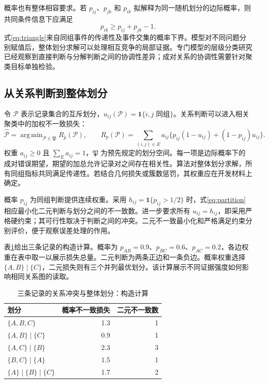 \documentclass[UTF8,a4paper,zihao=-4,fontset=fandol]{ctexart}
\newcommand{\ind}{\mathbf 1}
\DeclareMathOperator*{\argmin}{arg\,min}
\begin{document}
概率也有整体相容要求。若 $p_{ij}$、$p_{jk}$ 和 $p_{ik}$ 拟解释为同一随机划分的边际概率，则共同条件信息下应满足
\begin{equation}
 p_{ik}\geq p_{ij}+p_{jk}-1.
 \label{eq:triangle}
\end{equation}
式\eqref{eq:triangle}来自同组事件的传递性及事件交集的概率下界。模型对不同问题分别赋值后，整体划分求解可以处理相互竞争的局部证据。专门模型的层级分类研究已经观察到直接判断与分解判断之间的协调性差异\citep{joy2026}；成对关系的协调性需要针对聚类目标单独检验。

\subsection{从关系判断到整体划分}

令 $\mathcal P$ 表示记录集合的互斥划分，$u_{ij}(\mathcal P)=\ind\{i,j\text{ 同组}\}$。关系判断可以进入相关聚类中的加权不一致损失\citep{bansal2004}：
\begin{equation}
 \widehat{\mathcal P}=\argmin_{\mathcal P\in\mathfrak P}
 R_{\widehat p}(\mathcal P),\qquad
 R_p(\mathcal P)=\sum_{(i,j)\in E}a_{ij}
 \{p_{ij}(1-u_{ij})+(1-p_{ij})u_{ij}\}.
 \label{eq:partition}
\end{equation}
权重 $a_{ij}\geq0$ 且 $\sum_Ea_{ij}=1$，$\mathfrak P$ 为预先规定的划分空间。每一项是边际概率下的成对错误期望，期望的加总允许记录对之间存在相关性。算法对整体划分求解，所有同组指标共同满足传递性。若结合几何损失或簇数惩罚，其权重应在开发材料上确定。

概率 $p_{ij}$ 为同组判断提供连续权重。采用 $h_{ij}=\ind\{p_{ij}>1/2\}$ 时，式\eqref{eq:partition}相应最小化二元判断与划分之间的不一致数。进一步要求所有 $u_{ij}=h_{ij}$，即采用严格硬约束；其可行性取决于判断之间的冲突。二元不一致最小化和严格满足约束分别评价，便于观察误差处理的作用。

表\ref{tab:three}给出三条记录的构造计算。概率为 $p_{AB}=0.9$、$p_{BC}=0.6$、$p_{AC}=0.2$，各边权重在表中取一以展示损失总量。二元判断为两条正边和一条负边。概率权重选择 $\{A,B\}\mid\{C\}$，二元损失则有三个并列最优划分。该计算展示不同证据强度如何影响相同关系图的读取。

\begin{table}[htbp]
\centering\small
\caption{三条记录的关系冲突与整体划分：构造计算}\label{tab:three}
\begin{tabular}{@{}lrr@{}}
\toprule
划分 & 概率不一致损失 & 二元不一致数 \\
\midrule
$\{A,B,C\}$ & 1.3 & 1 \\
$\{A,B\}\mid\{C\}$ & 0.9 & 1 \\
$\{A,C\}\mid\{B\}$ & 2.3 & 3 \\
$\{B,C\}\mid\{A\}$ & 1.5 & 1 \\
$\{A\}\mid\{B\}\mid\{C\}$ & 1.7 & 2 \\
\bottomrule
\end{tabular}
\end{table}
\end{document}
